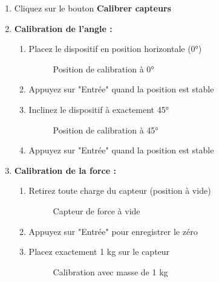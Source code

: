 \documentclass[12pt,a4paper]{article}
\begin{document}
\begin{enumerate}
    \item Cliquez sur le bouton \textbf{Calibrer capteurs}
    
    \item \textbf{Calibration de l'angle :}
    \begin{enumerate}
        \item Placez le dispositif en position horizontale (0°)
        \begin{figure}[H]
            \centering
            \caption{Position de calibration à 0°}
            \label{fig:calib_0}
        \end{figure}
        
        \item Appuyez sur "Entrée" quand la position est stable
        \item Inclinez le dispositif à exactement 45°
        \begin{figure}[H]
            \centering
            \caption{Position de calibration à 45°}
            \label{fig:calib_45}
        \end{figure}
        
        \item Appuyez sur "Entrée" quand la position est stable
    \end{enumerate}
    
    \item \textbf{Calibration de la force :}
    \begin{enumerate}
        \item Retirez toute charge du capteur (position à vide)
        \begin{figure}[H]
            \centering
            \caption{Capteur de force à vide}
            \label{fig:calib_vide}
        \end{figure}
        
        \item Appuyez sur "Entrée" pour enregistrer le zéro
        \item Placez exactement 1 kg sur le capteur
        \begin{figure}[H]
            \centering
            \caption{Calibration avec masse de 1 kg}
            \label{fig:calib_1kg}
        \end{figure}
        

\end{enumerate}
\end{enumerate}
\end{document}

